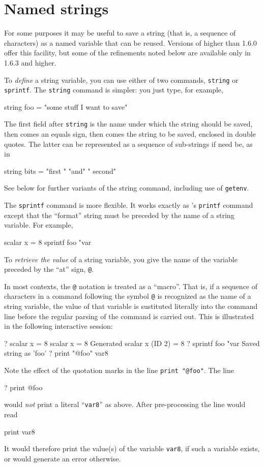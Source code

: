 \section{Named strings}
\label{named-strings}

For some purposes it may be useful to save a string (that is, a
sequence of characters) as a named variable that can be reused.
Versions of  higher than 1.6.0 offer this facility, but
some of the refinements noted below are available only in 
1.6.3 and higher.

To \textit{define} a string variable, you can use either of two
commands, \texttt{string} or \texttt{sprintf}.  The \texttt{string}
command is simpler: you just type, for example,
%
\begin{code}
string foo = "some stuff I want to save"
\end{code}
%
The first field after \texttt{string} is the name under which the
string should be saved, then comes an equals sign, then comes the
string to be saved, enclosed in double quotes.  The latter can be
represented as a sequence of sub-strings if need be, as in
%
\begin{code}
string bits = "first " "and" " second"
\end{code}
%
See below for further variants of the string command, including use of
\texttt{getenv}.  

The \texttt{sprintf} command is more flexible.  It works exactly as
's \texttt{printf} command except that the ``format''
string must be preceded by the name of a string variable.  For
example,
%
\begin{code}
scalar x = 8
sprintf foo "var%
\end{code}

To \textit{retrieve the value} of a string variable, you give the name
of the variable preceded by the ``at'' sign, \verb|@|.  

In most contexts, the \verb|@| notation is treated as a ``macro''.
That is, if a sequence of characters in a  command
following the symbol \verb|@| is recognized as the name of a string
variable, the value of that variable is sustituted literally into the
command line before the regular parsing of the command is
carried out.  This is illustrated in the following interactive
session:
%
\begin{code}
? scalar x = 8
 scalar x = 8
Generated scalar x (ID 2) = 8
? sprintf foo "var%
Saved string as 'foo'
? print "@foo"
var8
\end{code}
%
Note the effect of the quotation marks in the line 
\verb|print "@foo"|.  The line
%
\begin{code}
? print @foo
\end{code}
%
would \textit{not} print a literal ``\texttt{var8}'' as above.  After
pre-processing the line would read
%
\begin{code}
print var8
\end{code}
%
It would therefore print the value(s) of the variable \texttt{var8},
if such a variable exists, or would generate an error otherwise.

